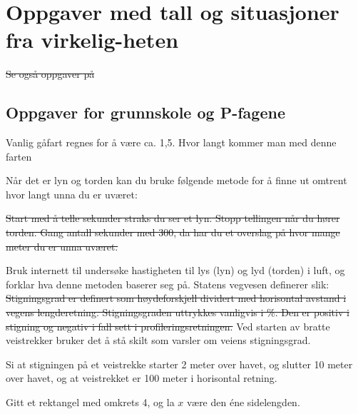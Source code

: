 





\section[Oppgaver med tall og situasjoner fra virkeligheten]{Oppgaver med tall og situasjoner fra virkelig-heten}	
\st{Se også oppgaver på }


\subsection*{Oppgaver for grunnskole og P-fagene}
Vanlig gåfart regnes for å være ca. 1,5. Hvor langt kommer man med denne farten
	
Når det er lyn og torden kan du bruke følgende metode for å finne ut omtrent hvor langt unna du er uværet:\os

\st{Start med å telle sekunder straks du ser et lyn. Stopp tellingen når du hører torden. Gang antall sekunder med 300, da har du et overslag på hvor mange meter du er unna uværet.}

Bruk internett til undersøke hastigheten til lys (lyn) og lyd (torden) i luft, og forklar hva denne metoden baserer seg på.
\newpage
{}
Statens vegvesen definerer  slik:
\st{
Stigningsgrad er definert som høydeforskjell dividert med horisontal avstand i vegens lengderetning.
Stigningsgraden uttrykkes vanligvis i \%. Den er positiv i stigning og negativ i fall sett i
profileringsretningen.
}
Ved starten av bratte veistrekker bruker det å stå skilt som varsler om veiens stigningsgrad. \os

Si at stigningen på et veistrekke starter 2 meter over havet, og slutter 10 meter over havet, og at veistrekket er 100 meter i horisontal retning. 

Gitt et rektangel med omkrets 4, og la $ x $ være den éne sidelengden.


